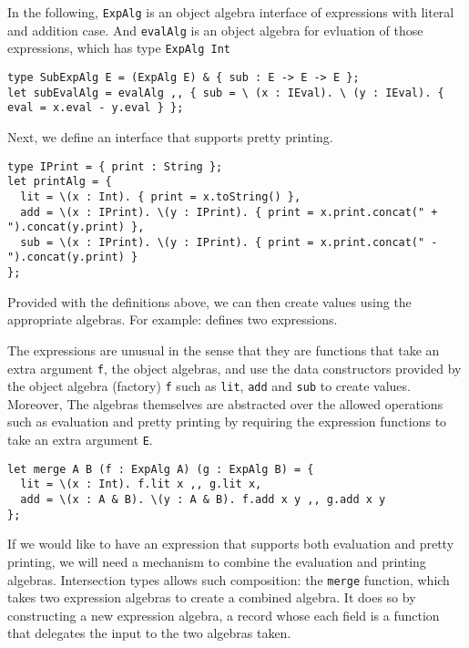 In the following, \lstinline{ExpAlg} is an object algebra interface of
expressions with literal and addition case. And \lstinline{evalAlg} is an object
algebra for evluation of those expressions, which has type \lstinline{ExpAlg Int}

\begin{verbatim}
type SubExpAlg E = (ExpAlg E) & { sub : E -> E -> E };
let subEvalAlg = evalAlg ,, { sub = \ (x : IEval). \ (y : IEval). { eval = x.eval - y.eval } };
\end{verbatim}

Next, we define an interface that supports pretty printing.

\begin{verbatim}
type IPrint = { print : String };
let printAlg = {
  lit = \(x : Int). { print = x.toString() },
  add = \(x : IPrint). \(y : IPrint). { print = x.print.concat(" + ").concat(y.print) },
  sub = \(x : IPrint). \(y : IPrint). { print = x.print.concat(" - ").concat(y.print) }
};
\end{verbatim}

Provided with the definitions above, we can then create values using the
appropriate algebras. For example:
defines two expressions.

The expressions are unusual in the sense that they are functions that take an
extra argument \lstinline{f}, the object algebras, and use the data constructors
provided by the object algebra (factory) \lstinline{f} such as \lstinline{lit},
\lstinline{add} and \lstinline{sub} to create values. Moreover, The algebras
themselves are abstracted over the allowed operations such as evaluation and
pretty printing by requiring the expression functions to take an extra argument
\lstinline{E}.

\begin{verbatim}
let merge A B (f : ExpAlg A) (g : ExpAlg B) = {
  lit = \(x : Int). f.lit x ,, g.lit x,
  add = \(x : A & B). \(y : A & B). f.add x y ,, g.add x y
};
\end{verbatim}

If we would like to have an expression that supports both evaluation and pretty
printing, we will need a mechanism to combine the evaluation and printing
algebras. Intersection types allows such composition: the \lstinline{merge}
function, which takes two expression algebras to create a combined algebra. It
does so by constructing a new expression algebra, a record whose each field is a
function that delegates the input to the two algebras taken.

